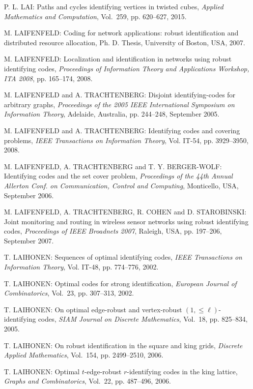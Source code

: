 \begin{thebibliography}{999}
P. L. LAI: Paths and cycles identifying vertices in twisted cubes, {\it Applied Mathematics and Computation}, Vol.~259, pp. 620--627, 2015.

M. LAIFENFELD: Coding for network applications: robust identification and distributed resource allocation, Ph. D. Thesis, University of Boston, USA, 2007. 

M. LAIFENFELD: Localization and identification in networks using robust identifying codes, {\it Proceedings of Information Theory and Applications Workshop, ITA 2008}, pp. 165--174, 2008.

M. LAIFENFELD and A. TRACHTENBERG: Disjoint identifying-codes for arbitrary graphs, {\it Proceedings of the 2005 IEEE International Symposium on Information Theory}, Adelaide, Australia, pp. 244--248, September 2005.

M. LAIFENFELD and A. TRACHTENBERG: Identifying codes and covering problems, {\it IEEE Transactions on Information Theory}, Vol. IT-54, pp. 3929--3950, 2008.

M. LAIFENFELD, A. TRACHTENBERG and T. Y. BERGER-WOLF: Identifying codes and the set cover problem, {\it Proceedings of the 44th Annual Allerton Conf. on Communication, Control and Computing}, Monticello, USA, September 2006.

M. LAIFENFELD, A. TRACHTENBERG, R. COHEN and D. STARO\-BINSKI: Joint monitoring and routing in wireless sensor networks using robust identifying codes, {\it Proceedings of IEEE Broadnets 2007}, Raleigh, USA, pp. 197--206, September 2007.

T. LAIHONEN: Sequences of optimal identifying codes, {\it IEEE Transactions on Information Theory}, Vol. IT-48, pp. 774--776, 2002.

T. LAIHONEN: Optimal codes for strong identification, {\it European Journal of Combinatorics}, Vol.~23, pp. 307--313, 2002.

T. LAIHONEN: On optimal edge-robust and vertex-robust $(1,\leq\ell)$-identifying codes, {\it SIAM Journal on Discrete Mathematics}, Vol.~18, pp. 825--834, 2005.

T. LAIHONEN: On robust identification in the square and king grids, {\it Discrete Applied Mathematics}, Vol.~154, pp. 2499--2510, 2006.


T. LAIHONEN: Optimal $t$-edge-robust $r$-identifying codes in the king lattice, {\it Graphs and Combinatorics}, Vol.~22, pp. 487--496, 2006.


\end{thebibliography}
